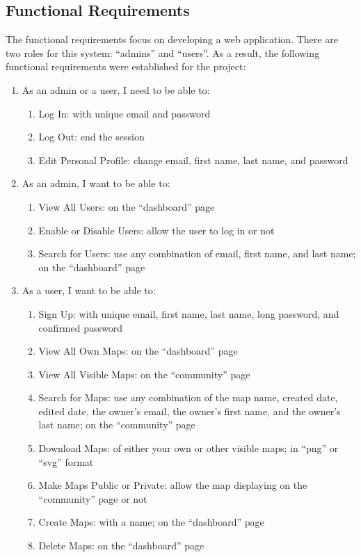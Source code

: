 \subsection{Functional Requirements}
The functional requirements focus on developing a web application. There are two roles for this system: ``admins'' and ``users''. As a result, the following functional requirements were established for the project:
\begin{enumerate}
  \item As an admin or a user, I need to be able to:
  \begin{enumerate}
    \item Log In: with unique email and password
    \item Log Out: end the session
    \item Edit Personal Profile: change email, first name, last name, and password
  \end{enumerate}
  \item As an admin, I want to be able to:
  \begin{enumerate}
    \item View All Users: on the ``dashboard'' page
    \item Enable or Disable Users: allow the user to log in or not
    \item Search for Users: use any combination of email, first name, and last name; on the ``dashboard'' page
  \end{enumerate}
  \item As a user, I want to be able to:
  \begin{enumerate}
    \item Sign Up: with unique email, first name, last name, long password, and confirmed password
    \item View All Own Maps: on the ``dashboard'' page
    \item View All Visible Maps: on the ``community'' page
    \item Search for Maps: use any combination of the map name, created date, edited date, the owner's email, the owner's first name, and the owner's last name; on the ``community'' page
    \item Download Maps: of either your own or other visible maps; in ``png'' or ``svg'' format
    \item Make Maps Public or Private: allow the map displaying on the ``community'' page or not
    \item Create Maps: with a name; on the ``dashboard'' page
    \item Delete Maps: on the ``dashboard'' page

\end{enumerate}
\end{enumerate}
